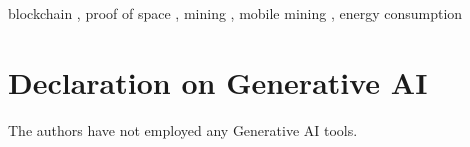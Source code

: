 \documentclass[
]{ceurart}
\begin{document}
\begin{keywords}
  blockchain \sep
  proof of space \sep
  mining \sep
  mobile mining \sep
  energy consumption
\end{keywords}









\section*{Declaration on Generative AI}
  The authors have not employed any Generative AI tools.


\end{document}
